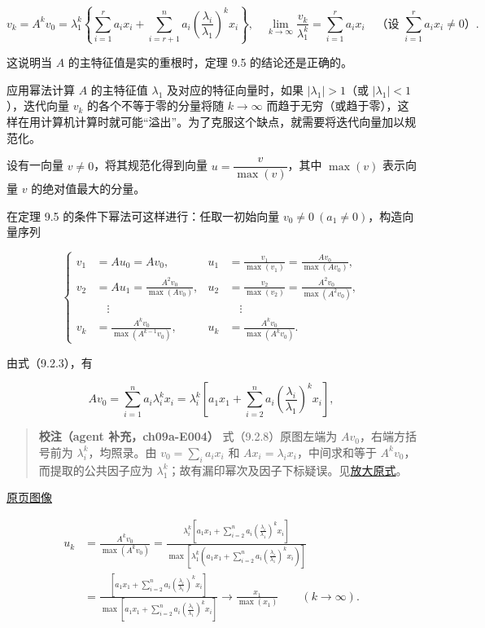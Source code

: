 \documentclass[
  10pt,
  fontset=fandol]{ctexart}
\begin{document}
\[
v_k=A^kv_0=\lambda_1^k\left\{\sum_{i=1}^ra_ix_i+\sum_{i=r+1}^na_i\left(\frac{\lambda_i}{\lambda_1}\right)^kx_i\right\},\quad
\lim_{k\to\infty}\frac{v_k}{\lambda_1^k}=\sum_{i=1}^ra_ix_i\quad\text{（设 }\sum_{i=1}^ra_ix_i\ne0\text{）}.
\]

这说明当 \(A\) 的主特征值是实的重根时，定理 9.5 的结论还是正确的。

应用幂法计算 \(A\) 的主特征值 \(\lambda_1\) 及对应的特征向量时，如果 \(|\lambda_1|>1\)（或 \(|\lambda_1|<1\)），迭代向量 \(v_k\) 的各个不等于零的分量将随 \(k\to\infty\) 而趋于无穷（或趋于零），这样在用计算机计算时就可能``溢出''。为了克服这个缺点，就需要将迭代向量加以规范化。

设有一向量 \(v\ne0\)，将其规范化得到向量 \(u=\dfrac{v}{\max(v)}\)，其中 \(\max(v)\) 表示向量 \(v\) 的绝对值最大的分量。

在定理 9.5 的条件下幂法可这样进行：任取一初始向量 \(v_0\ne0\ (a_1\ne0)\)，构造向量序列

\[
\left\{
\begin{aligned}
v_1&=Au_0=Av_0,&u_1&=\frac{v_1}{\max(v_1)}=\frac{Av_0}{\max(Av_0)},\\
v_2&=Au_1=\frac{A^2v_0}{\max(Av_0)},&u_2&=\frac{v_2}{\max(v_2)}=\frac{A^2v_0}{\max(A^2v_0)},\\
&\quad\vdots&&\quad\vdots\\
v_k&=\frac{A^kv_0}{\max(A^{k-1}v_0)},&u_k&=\frac{A^kv_0}{\max(A^kv_0)}.
\end{aligned}
\right.
\]

由式（9.2.3），有

\[
Av_0=\sum_{i=1}^na_i\lambda_i^kx_i=\lambda_i^k\left[a_1x_1+\sum_{i=2}^na_i\left(\frac{\lambda_i}{\lambda_1}\right)^kx_i\right],
\tag{9.2.8}
\]

\begin{quote}
\textbf{校注（agent 补充，ch09a-E004）} 式（9.2.8）原图左端为 \(Av_0\)，右端方括号前为 \(\lambda_i^k\)，均照录。由 \(v_0=\sum_i a_ix_i\) 和 \(Ax_i=\lambda_ix_i\)，中间求和等于 \(A^kv_0\)，而提取的公共因子应为 \(\lambda_1^k\)；故有漏印幂次及因子下标疑误。见\href{../assets/ch09a/review-p236-9-2-8.png}{放大原式}。
\end{quote}

\href{../../source-images/pdf-237.jpeg}{原页图像}

\[
\begin{aligned}
u_k&=\frac{A^kv_0}{\max(A^kv_0)}
=\frac{\lambda_i^k\left[a_1x_1+\displaystyle\sum_{i=2}^na_i\left(\frac{\lambda_i}{\lambda_1}\right)^kx_i\right]}{\max\left[\lambda_1^k\left(a_1x_1+\displaystyle\sum_{i=2}^na_i\left(\frac{\lambda_i}{\lambda_1}\right)^kx_i\right)\right]}\\
&=\frac{\left[a_1x_1+\displaystyle\sum_{i=2}^na_i\left(\frac{\lambda_i}{\lambda_1}\right)^kx_i\right]}{\max\left[a_1x_1+\displaystyle\sum_{i=2}^na_i\left(\frac{\lambda_i}{\lambda_1}\right)^kx_i\right]}
\to\frac{x_1}{\max(x_1)}\qquad(k\to\infty).
\end{aligned}
\]
\end{document}
